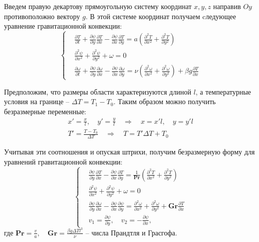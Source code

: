 \documentclass[a4paper, 12pt]{article}
\newcommand{\Pra}{\mathbf{Pr}}
\newcommand{\Gra}{\mathbf{Gr}}
\newcommand{\der}[2]{\frac{\partial {#1}}{\partial {#2}}}
\newcommand{\dder}[2]{\frac{\partial^2 {#1}}{\partial {#2}^2}}
\begin{document}
    Введем правую декартову прямоугольную систему координат $x,y,z$ направив
    $Oy$ противоположно вектору $g$. В этой системе координат получаем
    cледующее уравнение гравитационной конвекции:
    \begin{equation}
      \left\{
        \begin{aligned}
          &\der{T}{t} + \der{\psi}{y} \der{T}{x} - \der{\psi}{x} \der{T}{y} =
            a \left( \dder{T}{x} + \dder{T}{y} \right)
          \\
          &\dder{\psi}{x} + \dder{\psi}{y} + \omega = 0
          \\
          &\der{\omega}{t} + \der{\psi}{y} \der{\omega}{x} - \der{\psi}{x}
            \der{\omega}{y} = \nu \left(
              \dder{\omega}{x} + \dder{\omega}{y}
            \right) + \beta g \der{T}{x}
        \end{aligned}
      \right.\label{convection}
    \end{equation}

    Предположим, что размеры области характеризуются длиной $l$, а температурные
    условия на границе -- $\Delta T = T_1 - T_0$. Таким образом можно получить
    безразмерные переменные:
    \begin{gather*}
      x' = \frac{x}{l}, \quad y' = \frac{y}{l} \quad \Rightarrow \quad
        x = x' l, \quad y = y' l
      \\
      T'=\frac{T - T_0}{\Delta T} \quad \Rightarrow \quad
        T = T' \Delta T + T_0
    \end{gather*}

    Учитывая эти соотношения и опуская штрихи, получим безразмерную форму для
    уравнений гравитационной конвекции:
    $$
      \left\{
        \begin{aligned}
          &\der{\psi}{y} \der{T}{x} - \der{\psi}{x} \der{T}{y} = \frac{1}{\Pra}
            \left( \dder{T}{x} + \dder{T}{y} \right)
          \\
          &\dder{\psi}{x} + \dder{\psi}{y} + \omega = 0
          \\
          &\der{\psi}{y} \der{\omega}{x} - \der{\psi}{x} \der{\psi}{y} =
            \dder{\omega}{x} + \dder{\omega}{y} + \Gra \der{T}{x}
          \\
          &v_1 = \der{\psi}{y}, \quad v_2 = - \der{\psi}{x},
        \end{aligned}
      \right.
    $$
    где $\Pra = \frac{v}{a}, \quad \Gra = \frac{\beta g \Delta T l^{3}}{\nu}$ --
    числа Прандтля и Грасгофа.
\end{document}
